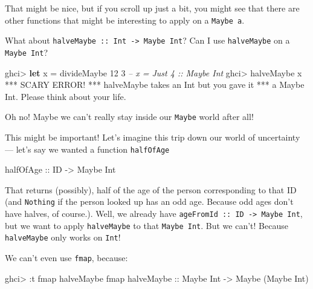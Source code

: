 \documentclass[]{article}
\newenvironment{Shaded}{\begin{snugshade}}{\end{snugshade}}
\newcommand{\CommentTok}[1]{\textcolor[rgb]{0.56,0.35,0.01}{\textit{#1}}}
\newcommand{\DataTypeTok}[1]{\textcolor[rgb]{0.13,0.29,0.53}{#1}}
\newcommand{\DecValTok}[1]{\textcolor[rgb]{0.00,0.00,0.81}{#1}}
\newcommand{\FunctionTok}[1]{\textcolor[rgb]{0.00,0.00,0.00}{#1}}
\newcommand{\KeywordTok}[1]{\textcolor[rgb]{0.13,0.29,0.53}{\textbf{#1}}}
\newcommand{\NormalTok}[1]{#1}
\newcommand{\OtherTok}[1]{\textcolor[rgb]{0.56,0.35,0.01}{#1}}
\begin{document}
That might be nice, but if you scroll up just a bit, you might see that there
are other functions that might be interesting to apply on a \texttt{Maybe\ a}.

What about \texttt{halveMaybe\ ::\ Int\ -\textgreater{}\ Maybe\ Int}? Can I use
\texttt{halveMaybe} on a \texttt{Maybe\ Int}?

\begin{Shaded}
\begin{Highlighting}[]
\NormalTok{ghci}\FunctionTok{>} \KeywordTok{let}\NormalTok{ x }\FunctionTok{=}\NormalTok{ divideMaybe }\DecValTok{12} \DecValTok{3}     \CommentTok{-- x = Just 4 :: Maybe Int}
\NormalTok{ghci}\FunctionTok{>}\NormalTok{ halveMaybe x}
\FunctionTok{***} \DataTypeTok{SCARY} \DataTypeTok{ERROR}\FunctionTok{!}
\FunctionTok{***}\NormalTok{ halveMaybe takes an }\DataTypeTok{Int}\NormalTok{ but you gave it}
\FunctionTok{***}\NormalTok{ a }\DataTypeTok{Maybe} \DataTypeTok{Int}\FunctionTok{.}  \DataTypeTok{Please}\NormalTok{ think about your life}\FunctionTok{.}
\end{Highlighting}
\end{Shaded}

Oh no! Maybe we can't really stay inside our \texttt{Maybe} world after all!

This might be important! Let's imagine this trip down our world of uncertainty
--- let's say we wanted a function \texttt{halfOfAge}

\begin{Shaded}
\begin{Highlighting}[]
\OtherTok{halfOfAge ::} \DataTypeTok{ID} \OtherTok{->} \DataTypeTok{Maybe} \DataTypeTok{Int}
\end{Highlighting}
\end{Shaded}

That returns (possibly), half of the age of the person corresponding to that ID
(and \texttt{Nothing} if the person looked up has an odd age. Because odd ages
don't have halves, of course.). Well, we already have
\texttt{ageFromId\ ::\ ID\ -\textgreater{}\ Maybe\ Int}, but we want to apply
\texttt{halveMaybe} to that \texttt{Maybe\ Int}. But we can't! Because
\texttt{halveMaybe} only works on \texttt{Int}!

We can't even use \texttt{fmap}, because:

\begin{Shaded}
\begin{Highlighting}[]
\NormalTok{ghci}\FunctionTok{>} \FunctionTok{:}\NormalTok{t fmap halveMaybe}
\NormalTok{fmap}\OtherTok{ halveMaybe ::} \DataTypeTok{Maybe} \DataTypeTok{Int} \OtherTok{->} \DataTypeTok{Maybe}\NormalTok{ (}\DataTypeTok{Maybe} \DataTypeTok{Int}\NormalTok{)}
\end{Highlighting}
\end{Shaded}
\end{document}
